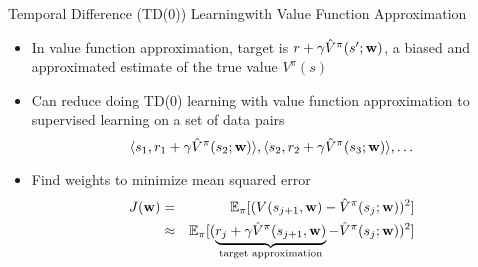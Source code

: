 \documentclass[aspectratio=169]{../latex_main/tntbeamer}  %
\begin{document}
\begin{frame}[c]{Temporal Difference (TD(0)) Learning\newline with Value Function Approximation}
	
	\begin{itemize}
		\item In value function approximation, target is $r + \gamma \hat{V}^\pi (s'; \mathbf{w})$, a biased and approximated estimate of the true value $V^\pi(s)$
		\item Can reduce doing TD(0) learning with value function approximation to supervised learning on a set of data pairs
		$$\langle  s_1, r_1+ \gamma \hat{V}^\pi (s_2; \mathbf{w}) \rangle, \langle  s_2, r_2+ \gamma \hat{V}^\pi (s_3; \mathbf{w}) \rangle, \ldots $$
		\item Find weights to minimize mean squared error
		\begin{eqnarray*}
		J(\mathbf{w}) &=& \mathbb{E}_\pi [(V(s_{j+1}, \mathbf{w}) - \hat{V}^\pi(s_j;\mathbf{w}))^2]\\
		&\approx& \mathbb{E}_\pi [(\underbrace{r_j + \gamma \hat{V}^\pi(s_{j+1}, \mathbf{w})}_{\text{target approximation}} - \hat{V}^\pi(s_j;\mathbf{w}))^2]
		\end{eqnarray*}

	\end{itemize}
	
\end{frame}
\end{document}

